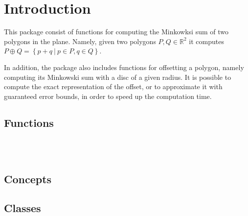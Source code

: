 \clearpage
{}
\label{chapterMinkowskiSumRef}

\section*{Introduction}
\label{mink_ref_sec:intro}

This package consist of functions for computing the Minkowksi sum
of two polygons in the plane. Namely, given two polygons $P,Q \in
\mathbb{R}^2$ it computes $P \oplus Q = \left\{ p + q ~|~ p \in P,
q \in Q \right\}$.

In addition, the package also includes functions for offsetting a
polygon, namely computing its Minkowski sum with a disc of a given
radius. It is possible to compute the exact representation of the
offset, or to approximate it with guaranteed error bounds, in order
to speed up the computation time.

\subsection*{Functions}

\\
\\

\subsection*{Concepts}


\subsection*{Classes}

\\
\\
\\
\\

